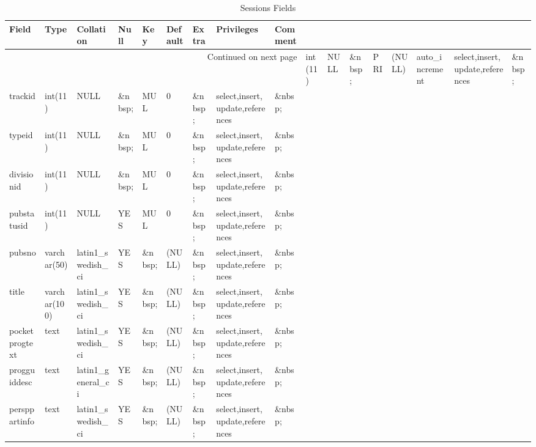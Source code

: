 \documentclass[tablesignature,landscape]{scrartcl}
\begin{document}
\begin{longtable}{|l|l|l|l|l|l|l|l|l|}
\caption{Sessions Fields} \label{tbl:sessionsfields}\\
\hline
 Field           &  Type          &  Collation                &  Null     &  Key      &  Default               &  Extra              &  Privileges                       &  Comment \\
\hline
\endhead
\hline\multicolumn{9}{r}{Continued on next page}\
\endfoot
\endlastfoot
\hline
 sessionid       &  int(11)       &  NULL                     &  \&nbsp;  &  PRI      &  (NULL)                &  auto\_{}increment  &  select,insert,update,references  &  \&nbsp;  \\
 trackid         &  int(11)       &  NULL                     &  \&nbsp;  &  MUL      &  0                     &  \&nbsp;            &  select,insert,update,references  &  \&nbsp;  \\
 typeid          &  int(11)       &  NULL                     &  \&nbsp;  &  MUL      &  0                     &  \&nbsp;            &  select,insert,update,references  &  \&nbsp;  \\
 divisionid      &  int(11)       &  NULL                     &  \&nbsp;  &  MUL      &  0                     &  \&nbsp;            &  select,insert,update,references  &  \&nbsp;  \\
 pubstatusid     &  int(11)       &  NULL                     &  YES      &  MUL      &  0                     &  \&nbsp;            &  select,insert,update,references  &  \&nbsp;  \\
 pubsno          &  varchar(50)   &  latin1\_{}swedish\_{}ci  &  YES      &  \&nbsp;  &  (NULL)                &  \&nbsp;            &  select,insert,update,references  &  \&nbsp;  \\
 title           &  varchar(100)  &  latin1\_{}swedish\_{}ci  &  YES      &  \&nbsp;  &  (NULL)                &  \&nbsp;            &  select,insert,update,references  &  \&nbsp;  \\
 pocketprogtext  &  text          &  latin1\_{}swedish\_{}ci  &  YES      &  \&nbsp;  &  (NULL)                &  \&nbsp;            &  select,insert,update,references  &  \&nbsp;  \\
 progguiddesc    &  text          &  latin1\_{}general\_{}ci  &  YES      &  \&nbsp;  &  (NULL)                &  \&nbsp;            &  select,insert,update,references  &  \&nbsp;  \\
 persppartinfo   &  text          &  latin1\_{}swedish\_{}ci  &  YES      &  \&nbsp;  &  (NULL)                &  \&nbsp;            &  select,insert,update,references  &  \&nbsp;  \\

\end{longtable}
\end{document}

